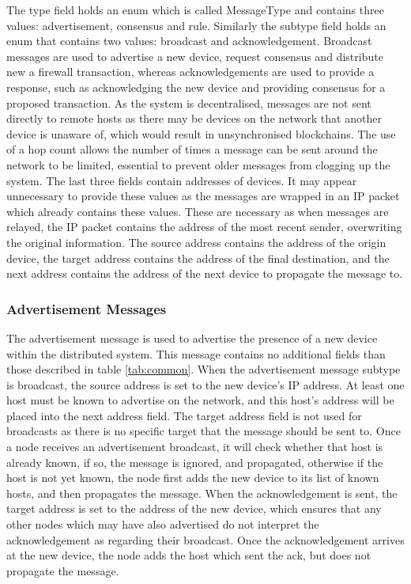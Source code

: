 \documentclass[a4paper, 11pt]{report}
\begin{document}
The type field holds an enum which is called MessageType and contains three values: advertisement, consensus and rule. Similarly the subtype field holds an enum that contains two values: broadcast and acknowledgement. Broadcast messages are used to advertise a new device, request consensus and distribute new a firewall transaction, whereas acknowledgements are used to provide a response, such as acknowledging the new device and providing consensus for a proposed transaction. As the system is decentralised, messages are not sent directly to remote hosts as there may be devices on the network that another device is unaware of, which would result in unsynchronised \gls{blockchain}s. The use of a hop count allows the number of times a message can be sent around the network to be limited, essential to prevent older messages from clogging up the system. The last three fields contain addresses of devices. It may appear unnecessary to provide these values as the messages are wrapped in an \acrshort{IP} packet which already contains these values. These are necessary as when messages are relayed, the \acrshort{IP} packet contains the address of the most recent sender, overwriting the original information. The source address contains the address of the origin device, the target address contains the address of the final destination, and the next address contains the address of the next device to propagate the message to.

\subsubsection{Advertisement Messages}
The advertisement message is used to advertise the presence of a new device within the distributed system. This message contains no additional fields than those described in table \ref{tab:common}. When the advertisement message subtype is broadcast, the source address is set to the new device's \acrshort{IP} address. At least one host must be known to advertise on the network, and this host's address will be placed into the next address field. The target address field is not used for broadcasts as there is no specific target that the message should be sent to. Once a node receives an advertisement broadcast, it will check whether that host is already known, if so, the message is ignored, and propagated, otherwise if the host is not yet known, the node first adds the new device to its list of known hosts, and then propagates the message. When the acknowledgement is sent, the target address is set to the address of the new device, which ensures that any other nodes which may have also advertised do not interpret the acknowledgement as regarding their broadcast. Once the acknowledgement arrives at the new device, the node adds the host which sent the ack, but does not propagate the message.
\end{document}

